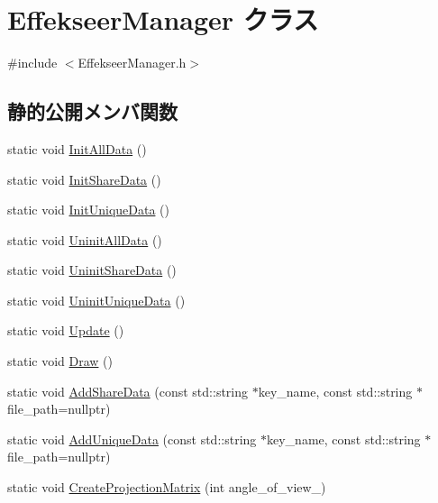 \hypertarget{class_effekseer_manager}{}\section{Effekseer\+Manager クラス}
\label{class_effekseer_manager}


{\ttfamily \#include $<$Effekseer\+Manager.\+h$>$}

\subsection*{静的公開メンバ関数}
\begin{DoxyCompactItemize}
\item 
static void \mbox{\hyperlink{class_effekseer_manager_ac5744fba29048e417bf46a8fbf5a8e76}{Init\+All\+Data}} ()
\item 
static void \mbox{\hyperlink{class_effekseer_manager_a881d9bdd981c35de66174363517050b4}{Init\+Share\+Data}} ()
\item 
static void \mbox{\hyperlink{class_effekseer_manager_a95d9d2eda8cb691c2565d022198b5787}{Init\+Unique\+Data}} ()
\item 
static void \mbox{\hyperlink{class_effekseer_manager_aa9f5c911182097238d979cc628f2dc13}{Uninit\+All\+Data}} ()
\item 
static void \mbox{\hyperlink{class_effekseer_manager_ab83021d09eeeaba41852c8db2f07fe55}{Uninit\+Share\+Data}} ()
\item 
static void \mbox{\hyperlink{class_effekseer_manager_abd448f6ec39f2306a6dc99b79aff0362}{Uninit\+Unique\+Data}} ()
\item 
static void \mbox{\hyperlink{class_effekseer_manager_a2278033d786e1ada0fcaa390a613a8f9}{Update}} ()
\item 
static void \mbox{\hyperlink{class_effekseer_manager_a0c9155e72b0552e5138e68be682a63a4}{Draw}} ()
\item 
static void \mbox{\hyperlink{class_effekseer_manager_aec98cb9052d849cae3f9cfee80c4c873}{Add\+Share\+Data}} (const std\+::string $\ast$key\+\_\+name, const std\+::string $\ast$file\+\_\+path=nullptr)
\item 
static void \mbox{\hyperlink{class_effekseer_manager_ad89f0ad2a840f191c088d35ddfd2ec62}{Add\+Unique\+Data}} (const std\+::string $\ast$key\+\_\+name, const std\+::string $\ast$file\+\_\+path=nullptr)
\item 
static void \mbox{\hyperlink{class_effekseer_manager_ae4faa1c46f9b4a372559567748df2384}{Create\+Projection\+Matrix}} (int angle\+\_\+of\+\_\+view\+\_\+)

\end{DoxyCompactItemize}
